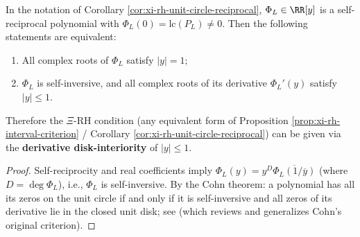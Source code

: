 \begin{proposition}\label{prop:xi-rh-cohn-derivative}
In the notation of Corollary \ref{cor:xi-rh-unit-circle-reciprocal}, \(\Phi_L\in\RR[y]\) is a self-reciprocal polynomial with \(\Phi_L(0)=\mathrm{lc}(P_L)\neq 0\).
Then the following statements are equivalent:
\begin{enumerate}
  \item All complex roots of \(\Phi_L\) satisfy \(|y|=1\);
  \item \(\Phi_L\) is self-inversive, and all complex roots of its derivative \(\Phi_L'(y)\) satisfy \(|y|\le 1\).
\end{enumerate}
Therefore the \(\Xi\)-RH condition (any equivalent form of Proposition \ref{prop:xi-rh-interval-criterion} / Corollary \ref{cor:xi-rh-unit-circle-reciprocal}) can be given via the \textbf{derivative disk-interiority} of \(|y|\le 1\).
\end{proposition}
\begin{proof}
Self-reciprocity and real coefficients imply
\(
\Phi_L(y)=y^{D}\overline{\Phi_L(1/\overline{y})}
\)
(where \(D=\deg\Phi_L\)), i.e., \(\Phi_L\) is self-inversive.
By the Cohn theorem: a polynomial has all its zeros on the unit circle if and only if it is self-inversive and all zeros of its derivative lie in the closed unit disk; see \cite{LalinSmyth2012UnimodularitySelfInversive} (which reviews and generalizes Cohn's original criterion).
\end{proof}

